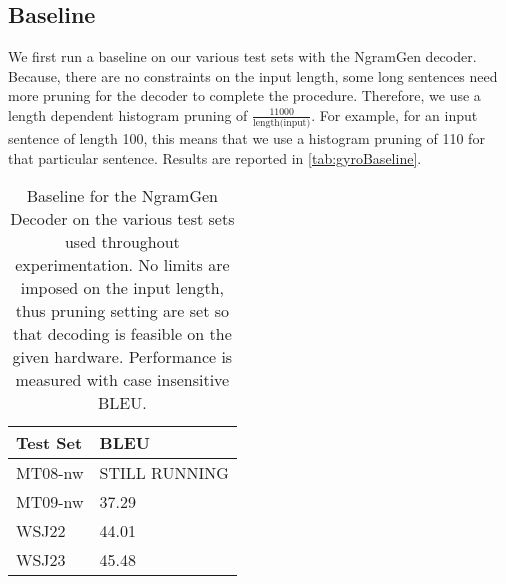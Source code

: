 \subsection{Baseline}
\label{sec:gyroBaseline}

We first run a baseline on our various test sets with the NgramGen decoder.
Because, there are no constraints on the input length, some long sentences
need more pruning for the decoder to complete the procedure.
Therefore, we use a length dependent histogram pruning of
$\frac{11000}{\text{length(input)}}$. For example, for an input sentence
of length 100, this means that we use a histogram pruning of 110 for that
particular sentence. Results are reported in \autoref{tab:gyroBaseline}.
%
\begin{table}
  \begin{center}
  \begin{tabular}{l|l}
    Test Set & BLEU \\
    \hline
    MT08-nw & STILL RUNNING \\
    MT09-nw & 37.29 \\
    WSJ22 & 44.01 \\
    WSJ23 & 45.48 \\
  \end{tabular}
  \caption{Baseline for the NgramGen Decoder on the various test sets used throughout experimentation. No
    limits are imposed on the input length, thus pruning setting are set so that decoding is feasible on
    the given hardware. Performance is measured with case insensitive BLEU.}
  \label{tab:gyroBaseline}
  \end{center}
\end{table}


